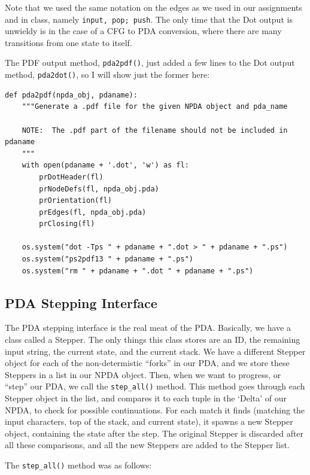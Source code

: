 \documentclass[a4paper]{article}
\begin{document}
Note that we used the same notation on the edges as we used in our assignments
and in class, namely \texttt{input, pop; push}.  The only time that the Dot
output is unwieldy is in the case of a CFG to PDA conversion, where there are
many transitions from one state to itself.

The PDF output method, \texttt{pda2pdf()}, just added a few lines to the Dot
output method, \texttt{pda2dot()}, so I will show just the former here:

\begin{verbatim}
def pda2pdf(npda_obj, pdaname):
    """Generate a .pdf file for the given NPDA object and pda_name

    NOTE:  The .pdf part of the filename should not be included in pdaname
    """
    with open(pdaname + '.dot', 'w') as fl:
        prDotHeader(fl)
        prNodeDefs(fl, npda_obj.pda)
        prOrientation(fl)
        prEdges(fl, npda_obj.pda)
        prClosing(fl)

    os.system("dot -Tps " + pdaname + ".dot > " + pdaname + ".ps")
    os.system("ps2pdf13 " + pdaname + ".ps")
    os.system("rm " + pdaname + ".dot " + pdaname + ".ps")
\end{verbatim}

\subsection{PDA Stepping Interface}

The PDA stepping interface is the real meat of the PDA.  Basically, we have a
class called a Stepper.  The only things this class stores are an ID, the
remaining input string, the current state, and the current stack.  We have a
different Stepper object for each of the non-determistic ``forks'' in our PDA,
and we store these Steppers in a list in our NPDA object.  Then, when we want
to progress, or ``step'' our PDA, we call the \texttt{step\_all()} method.
This method goes through each Stepper object in the list, and compares it to
each tuple in the `Delta' of our NPDA, to check for possible continuations.
For each match it finds (matching the input characters, top of the stack, and
current state), it spawns a new Stepper object, containing the state after the
step.  The original Stepper is discarded after all these comparisons, and all
the new Steppers are added to the Stepper list.

The \texttt{step\_all()} method was as follows:
\end{document}
